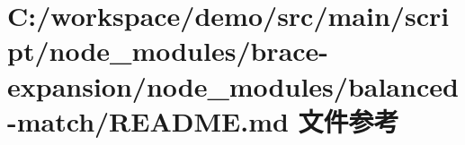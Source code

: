 \hypertarget{node__modules_2brace-expansion_2node__modules_2balanced-match_2_r_e_a_d_m_e_8md}{}\section{C\+:/workspace/demo/src/main/script/node\+\_\+modules/brace-\/expansion/node\+\_\+modules/balanced-\/match/\+R\+E\+A\+D\+ME.md 文件参考}
\label{node__modules_2brace-expansion_2node__modules_2balanced-match_2_r_e_a_d_m_e_8md}
